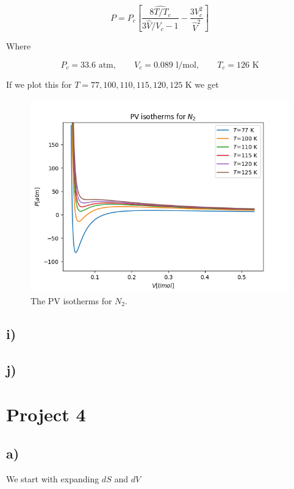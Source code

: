 \documentclass[a4paper,norsk, 10pt]{article}
\begin{document}
\begin{equation}
P = P_c\left[\frac{\hat{8T/T_c}}{3\hat{V}/V_c - 1} - \frac{3V_c^2}{\hat{V}^2}\right]
\end{equation}

Where

\begin{equation}
P_c = 33.6 \text{ atm}, \qquad V_c = 0.089 \text{ l/mol}, \qquad T_c = 126 \text{ K}
\end{equation}

If we plot this for $T = 77,100,110,115,120,125$ K we get

\begin{figure}[H]
\centering
\includegraphics[scale=0.5]{isoTherm.png}
\caption{The PV isotherms for $N_2$.}
\label{fig:isoTherm}
\end{figure}

\subsection{i)}


\subsection{j)}

\section{Project 4}
\subsection{a)}
We start with expanding $dS$ and $dV$
\end{document}
